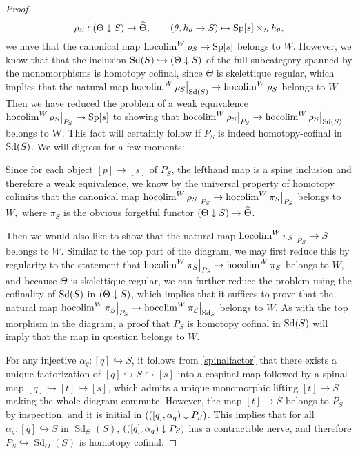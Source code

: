 \begin{proof}
\[\rho_S:{(\Theta\downarrow S)}\to \widehat{\Theta}, \qquad (\theta,h_\theta\to S)\mapsto {\operatorname{Sp}}[s] \times_S h_\theta,\]
we have that the canonical map \(\operatorname{hocolim}^W \rho_S \to {\operatorname{Sp}}[s]\) belongs to \(W\).  However, we know that that the inclusion  \({\operatorname{Sd}}(S)\hookrightarrow {(\Theta\downarrow S)}\) of the full subcategory spanned by the monomorphisms is homotopy cofinal, since \(\Theta\) is skelettique regular, which implies that the natural map \(\hocolim^W \eval[1]{\rho_S}_{\Sd(S)}\to \hocolim^W \rho_S\) belongs to \(W\).  Then we have reduced the problem of a weak equivalence \(\hocolim^W\eval[1]{\rho_S}_{P_S} \to \Sp[s]\) to showing that \(\hocolim^W\eval[1]{\rho_S}_{P_S}\to \hocolim^W \eval[1]{\rho_S}_{\Sd(S)}\) belongs to W.  This fact will certainly follow if \(P_S\) is indeed homotopy-cofinal in \({\operatorname{Sd}}(S)\).  We will digress for a few moments:

Since for each object \([p]\to [s]\) of \(P_S\), the lefthand map is a spine inclusion and therefore a weak equivalence, we know by the universal property of homotopy colimits that the canonical map \(\hocolim^W\eval[1]{\rho_S}_{P_S}\to \hocolim^W\eval[1]{\pi_S}_{P_S}\) belongs to \(W,\) where \(\pi_S\) is the obvious forgetful functor \({(\Theta\downarrow S)}\to \widehat{\Theta}\).

Then we would also like to show that the natural map \(\hocolim^W\eval[1]{\pi_S}_{P_S}\to S\) belongs to \(W\).  Similar to the top part of the diagram, we may first reduce this by regularity to the statement that \(\hocolim^W\eval[1]{\pi_S}_{P_S}\to \hocolim^W{\pi_S}\) belongs to \(W\), and because \(\Theta\) is skelettique regular, we can further reduce the problem using the cofinality of \({\operatorname{Sd}}(S)\) in \({(\Theta\downarrow S)}\), which implies that it suffices to prove that the natural map \(\hocolim^W\eval[1]{\pi_S}_{P_S}\to \hocolim^W \eval[1]{\pi_S}_{\Sd_S}\) belongs to \(W\).  As with the top morphism in the diagram, a proof that \(P_S\) is homotopy cofinal in \({\operatorname{Sd}}(S)\) will imply that the map in question belongs to \(W\).  

For any injective \(\alpha_q:[q]\hookrightarrow S\), it follows from \eqref{spinalfactor} that there exists a unique factorization of \([q]\hookrightarrow S\hookrightarrow [s]\) into a cospinal map followed by a spinal map \([q]\hookrightarrow [t]\hookrightarrow [s]\), which admits a unique monomorphic lifting \([t]\to S\) making the whole diagram commute.  However, the map \([t]\to S\) belongs to \(P_S\) by inspection, and it is initial in \({(([q],\alpha_q)\downarrow P_S)}\).  This implies that for all \(\alpha_q:[q]\hookrightarrow S\) in \(\operatorname{Sd}_\Theta(S)\), \({(([q],\alpha_q)\downarrow P_S)}\) has a contractible nerve, and therefore \(P_S\hookrightarrow \operatorname{Sd}_\Theta(S)\) is homotopy cofinal.  
\end{proof}
